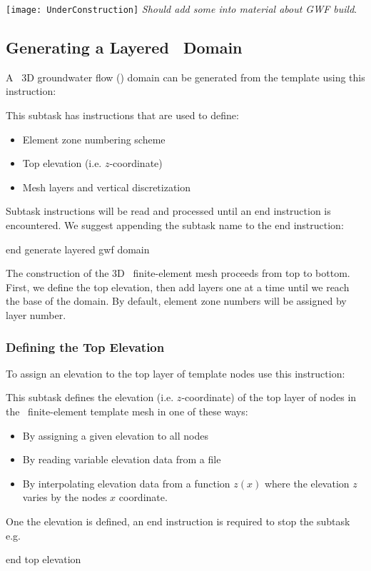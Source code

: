 \label{texfile:GWF}
\texttt{[image: UnderConstruction]} \textit{
Should add some into material about GWF build}.

\subsection{Generating a Layered \gwf\ Domain}
A \mfus\ 3D groundwater flow (\gwf) domain can be generated from the template using this instruction:

    {This subtask has instructions that are used to define:
     \begin{itemize}
        \item Element zone numbering scheme
        \item Top elevation (i.e. $z$-coordinate)
        \item Mesh layers and vertical discretization
    \end{itemize}

    Subtask instructions will be read and processed until an \textsf{end} instruction is encountered.  We suggest appending the subtask name to the \textsf{end} instruction:

    {\Large \sf end generate layered gwf domain}
    }

The construction of the 3D \gwf\ finite-element mesh proceeds from top to bottom.  First, we define the top elevation, then add layers one at a time until we reach the base of the domain. By default, element zone numbers will be assigned by layer number.

\subsubsection{Defining the Top Elevation}
To assign an elevation to the top layer of template nodes use this instruction:

    {This subtask defines the elevation (i.e. $z$-coordinate) of the top layer of nodes in the \gwf\ finite-element template mesh in one of these ways:
     \begin{itemize}
        \item By assigning a given elevation to all nodes
        \item By reading variable elevation data from a file
        \item By interpolating elevation data from a function $z(x)$ where the elevation $z$ varies by the nodes $x$ coordinate.
     \end{itemize}
     One the elevation is defined, an \textsf{end} instruction is required to stop the subtask e.g.\:

    {\Large \sf end top elevation}
    }

